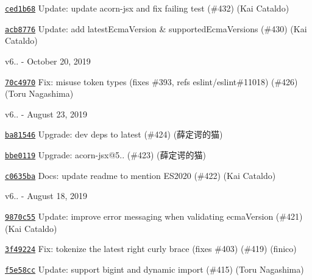 \begin{DoxyItemize}
\item \href{https://github.com/eslint/espree/commit/ced1b6810b991531e6d3788ebd5a322fc5c7d463}{\texttt{ {\ttfamily ced1b68}}} Update\+: update acorn-\/jsx and fix failing test (\#432) (Kai Cataldo)
\item \href{https://github.com/eslint/espree/commit/acb8776d369abf9e02f79142879e9b1a4774f938}{\texttt{ {\ttfamily acb8776}}} Update\+: add latest\+Ecma\+Version \& supported\+Ecma\+Versions (\#430) (Kai Cataldo)
\end{DoxyItemize}

v6.. -\/ October 20, 2019


\begin{DoxyItemize}
\item \href{https://github.com/eslint/espree/commit/70c4970e5eba6f060e1e32a22d231647f2d0e0f8}{\texttt{ {\ttfamily 70c4970}}} Fix\+: misuse token types (fixes \#393, refs eslint/eslint\#11018) (\#426) (Toru Nagashima)
\end{DoxyItemize}

v6.. -\/ August 23, 2019


\begin{DoxyItemize}
\item \href{https://github.com/eslint/espree/commit/ba81546e8552ec0f779aae7e03668c334630484e}{\texttt{ {\ttfamily ba81546}}} Upgrade\+: dev deps to latest (\#424) (薛定谔的猫)
\item \href{https://github.com/eslint/espree/commit/bbe01195fb57e24634d18825d39b820ed1767e95}{\texttt{ {\ttfamily bbe0119}}} Upgrade\+: acorn-\/jsx@5.. (\#423) (薛定谔的猫)
\item \href{https://github.com/eslint/espree/commit/c0635bac4cd891cb612fb81655012e2579f4e2b1}{\texttt{ {\ttfamily c0635ba}}} Docs\+: update readme to mention ES2020 (\#422) (Kai Cataldo)
\end{DoxyItemize}

v6.. -\/ August 18, 2019


\begin{DoxyItemize}
\item \href{https://github.com/eslint/espree/commit/9870c553efd3eb1bd22b4b3bb5220896c5cb6933}{\texttt{ {\ttfamily 9870c55}}} Update\+: improve error messaging when validating ecma\+Version (\#421) (Kai Cataldo)
\item \href{https://github.com/eslint/espree/commit/3f49224eb05f6b8cb1b996ce424a99c40978b389}{\texttt{ {\ttfamily 3f49224}}} Fix\+: tokenize the latest right curly brace (fixes \#403) (\#419) (finico)
\item \href{https://github.com/eslint/espree/commit/f5e58cc5e9030793baca3426366b8d7286ef5b89}{\texttt{ {\ttfamily f5e58cc}}} Update\+: support bigint and dynamic import (\#415) (Toru Nagashima)
\end{DoxyItemize}

